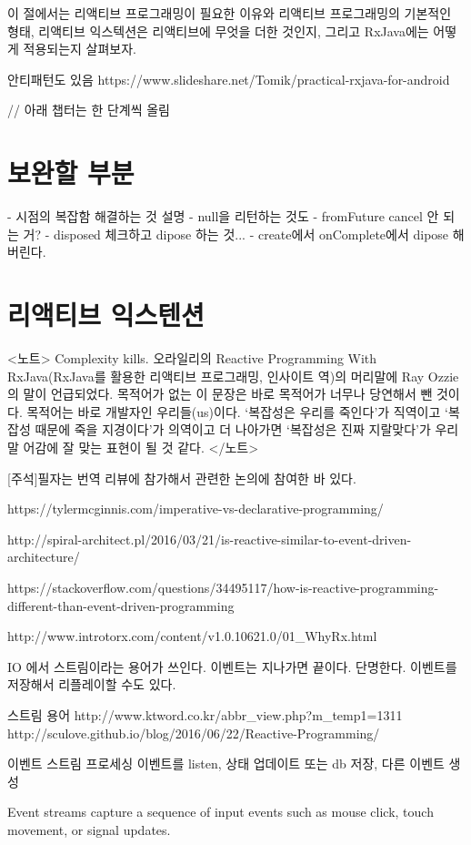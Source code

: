 \documentclass{book}
\begin{document}
이 절에서는 리액티브 프로그래밍이 필요한 이유와 리액티브 프로그래밍의 기본적인 형태, 리액티브 익스텍션은 리액티브에 무엇을 더한 것인지, 그리고 RxJava에는 어떻게 적용되는지 살펴보자.

안티패턴도 있음
https://www.slideshare.net/Tomik/practical-rxjava-for-android

// 아래 챕터는 한 단계씩 올림
\chapter{보완할 부분}
- 시점의 복잡함 해결하는 것 설명
- null을 리턴하는 것도 
- fromFuture cancel 안 되는 거?
- disposed 체크하고 dipose 하는 것...
- create에서 onComplete에서 dipose 해버린다.


\chapter{리액티브 익스텐션}

<노트>
Complexity kills. 오라일리의 Reactive Programming With RxJava(RxJava를 활용한 리액티브 프로그래밍, 인사이트 역)의 머리말에 Ray Ozzie의 말이 언급되었다. 목적어가 없는 이 문장은 바로 목적어가 너무나 당연해서 뺀 것이다. 목적어는 바로 개발자인 우리들(us)이다. ‘복잡성은 우리를 죽인다’가 직역이고 ‘복잡성 때문에 죽을 지경이다’가 의역이고 더 나아가면 ‘복잡성은 진짜 지랄맞다’가 우리말 어감에 잘 맞는 표현이 될 것 같다.
</노트>

[주석]필자는 번역 리뷰에 참가해서 관련한 논의에 참여한 바 있다.


https://tylermcginnis.com/imperative-vs-declarative-programming/

http://spiral-architect.pl/2016/03/21/is-reactive-similar-to-event-driven-architecture/

https://stackoverflow.com/questions/34495117/how-is-reactive-programming-different-than-event-driven-programming

http://www.introtorx.com/content/v1.0.10621.0/01_WhyRx.html

IO 에서 스트림이라는 용어가 쓰인다.
이벤트는 지나가면 끝이다. 단명한다. 이벤트를 저장해서 리플레이할 수도 있다.

스트림 용어
http://www.ktword.co.kr/abbr_view.php?m_temp1=1311
http://sculove.github.io/blog/2016/06/22/Reactive-Programming/

이벤트 스트림 프로세싱
이벤트를 listen, 상태 업데이트 또는 db 저장, 다른 이벤트 생성

Event streams capture a sequence of input events such as mouse click, touch movement, or signal updates.
\end{document}
